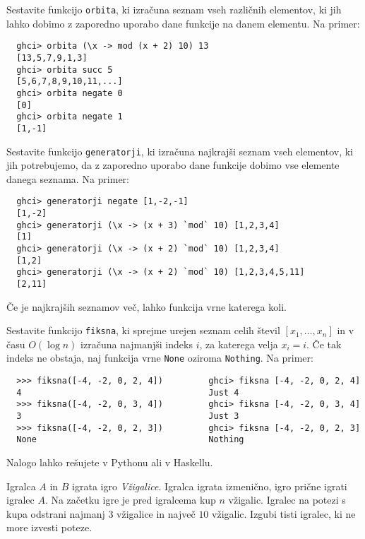 \documentclass[arhiv]{../izpit}
\begin{document}

\podnaloga
  Sestavite funkcijo \texttt{orbita}, ki izračuna seznam vseh različnih
  elementov, ki jih lahko dobimo z zaporedno uporabo dane funkcije na danem
  elementu. Na primer:
  \begin{verbatim}
  ghci> orbita (\x -> mod (x + 2) 10) 13
  [13,5,7,9,1,3]
  ghci> orbita succ 5
  [5,6,7,8,9,10,11,...]
  ghci> orbita negate 0
  [0]
  ghci> orbita negate 1
  [1,-1]
  \end{verbatim}

\podnaloga
  Sestavite funkcijo \texttt{generatorji}, ki izračuna najkrajši seznam vseh
  elementov, ki jih potrebujemo, da z zaporedno uporabo dane funkcije dobimo
  vse elemente danega seznama. Na primer:
  \begin{verbatim}
  ghci> generatorji negate [1,-2,-1]
  [1,-2]
  ghci> generatorji (\x -> (x + 3) `mod` 10) [1,2,3,4]
  [1]
  ghci> generatorji (\x -> (x + 2) `mod` 10) [1,2,3,4]
  [1,2]
  ghci> generatorji (\x -> (x + 2) `mod` 10) [1,2,3,4,5,11]
  [2,11] 
  \end{verbatim}
  Če je najkrajših seznamov več, lahko funkcija vrne katerega koli.


  Sestavite funkcijo \texttt{fiksna}, ki sprejme urejen seznam celih števil 
  $[x_1, \dots, x_n]$ in v času $O(\log n)$ izračuna najmanjši indeks $i$, za katerega velja $x_i = i$.
  Če tak indeks ne obstaja, naj funkcija vrne \texttt{None} oziroma \texttt{Nothing}.
  Na primer:

  \begin{verbatim}
  >>> fiksna([-4, -2, 0, 2, 4])         ghci> fiksna [-4, -2, 0, 2, 4]
  4                                     Just 4
  >>> fiksna([-4, -2, 0, 3, 4])         ghci> fiksna [-4, -2, 0, 3, 4]
  3                                     Just 3
  >>> fiksna([-4, -2, 0, 2, 3])         ghci> fiksna [-4, -2, 0, 2, 3]
  None                                  Nothing
  \end{verbatim}   
  Nalogo lahko rešujete v Pythonu ali v Haskellu.



Igralca $A$ in $B$ igrata igro {\em Vžigalice}. Igralca igrata
izmenično, igro prične igrati igralec $A$. Na začetku igre je pred igralcema
kup $n$ vžigalic. Igralec na potezi s kupa odstrani najmanj $3$ vžigalice 
in največ $10$ vžigalic. Izgubi tisti igralec, ki ne more izvesti poteze.
\end{document}
